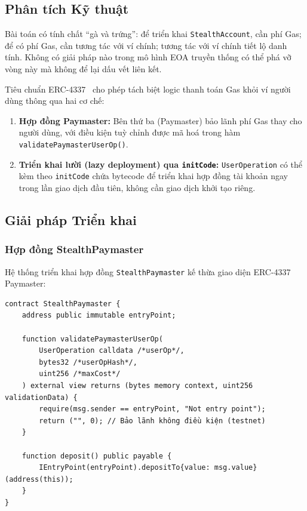\documentclass[../DoAn.tex]{subfiles}
\begin{document}
\subsection{Phân tích Kỹ thuật}
\label{subsec:cold_start_analysis}

Bài toán có tính chất ``gà và trứng'': để triển khai \texttt{StealthAccount}, cần phí Gas; để có phí Gas, cần tương tác với ví chính; tương tác với ví chính tiết lộ danh tính. Không có giải pháp nào trong mô hình EOA truyền thống có thể phá vỡ vòng này mà không để lại dấu vết liên kết.

Tiêu chuẩn ERC-4337~\cite{erc4337} cho phép tách biệt logic thanh toán Gas khỏi ví người dùng thông qua hai cơ chế:
\begin{enumerate}
    \item \textbf{Hợp đồng Paymaster:} Bên thứ ba (Paymaster) bảo lãnh phí Gas thay cho người dùng, với điều kiện tuỳ chỉnh được mã hoá trong hàm \texttt{validatePaymasterUserOp()}.
    \item \textbf{Triển khai lười (lazy deployment) qua \texttt{initCode}:} \texttt{UserOperation} có thể kèm theo \texttt{initCode} chứa bytecode để triển khai hợp đồng tài khoản ngay trong lần giao dịch đầu tiên, không cần giao dịch khởi tạo riêng.
\end{enumerate}

\subsection{Giải pháp Triển khai}
\label{subsec:cold_start_solution}

\subsubsection{Hợp đồng StealthPaymaster}

Hệ thống triển khai hợp đồng \texttt{StealthPaymaster} kế thừa giao diện ERC-4337 Paymaster:

\begin{verbatim}
contract StealthPaymaster {
    address public immutable entryPoint;

    function validatePaymasterUserOp(
        UserOperation calldata /*userOp*/,
        bytes32 /*userOpHash*/,
        uint256 /*maxCost*/
    ) external view returns (bytes memory context, uint256 validationData) {
        require(msg.sender == entryPoint, "Not entry point");
        return ("", 0); // Bảo lãnh không điều kiện (testnet)
    }

    function deposit() public payable {
        IEntryPoint(entryPoint).depositTo{value: msg.value}(address(this));
    }
}
\end{verbatim}
\end{document}
